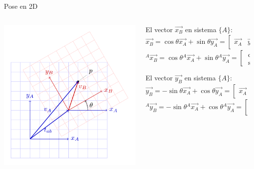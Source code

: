 \documentclass[presentation,aspectratio=169]{beamer}
\newcommand*{\vecref}[2]{\ensuremath{^#2 \vec{#1}}}
\newcommand*{\refsys}[1]{\ensuremath{\{#1\}}}
\begin{document}
\begin{frame}[label={sec:orge9197f0}]{Pose en 2D}
\begin{columns}
\begin{column}{0.3\columnwidth}
\begin{center}
\includegraphics[height=0.6\textheight]{../figures/2d-transform}
\end{center}
\end{column}

\begin{column}{0.7\columnwidth}
\footnotesize

El vector \(\vec{x_B}\) en sistema \refsys{A}:
\[ \vec{x_B} = \cos\theta \vec{x_A} +\sin\theta\vec{y_A} =
\begin{bmatrix}\vec{x_A} & \vec{y_A} \end{bmatrix} \begin{bmatrix} \cos\theta\\\sin\theta \end{bmatrix}\]
\[ \vecref{x_B}{A} = \cos\theta \vecref{x_A}{A} +\sin\theta\vecref{y_A}{A} = \begin{bmatrix} \cos\theta\\\sin\theta \end{bmatrix}\]

\pause
El vector \(\vec{y_B}\) en sistema \refsys{A}: \[ \vec{y_B} = -\sin\theta \vec{x_A} +\cos\theta\vec{y_A} =
\begin{bmatrix}\vec{x_A} & \vec{y_A} \end{bmatrix} \begin{bmatrix} -\sin\theta\\\cos\theta \end{bmatrix}\]
\[ \vecref{y_B}{A} = -\sin\theta \vecref{x_A}{A} +\cos\theta\vecref{y_A}{A} = \begin{bmatrix} -\sin\theta\\\cos\theta \end{bmatrix}\]


\end{column}
\end{columns}
\end{frame}
\end{document}
